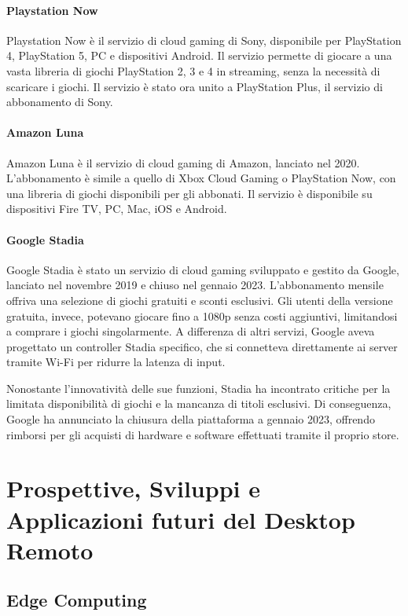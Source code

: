 \documentclass[12pt,a4paper,openright,twoside]{book}
\begin{document}
\subsubsection{Playstation Now}
Playstation Now è il servizio di cloud gaming di Sony, disponibile per PlayStation 4, PlayStation 5, PC e dispositivi Android. Il servizio permette di giocare a una vasta libreria di giochi PlayStation 2, 3 e 4 in streaming, senza la necessità di scaricare i giochi. Il servizio è stato ora unito a PlayStation Plus, il servizio di abbonamento di Sony.

\subsubsection{Amazon Luna}
Amazon Luna è il servizio di cloud gaming di Amazon, lanciato nel 2020. L'abbonamento è simile a quello di Xbox Cloud Gaming o PlayStation Now, con una libreria di giochi disponibili per gli abbonati. Il servizio è disponibile su dispositivi Fire TV, PC, Mac, iOS e Android.

\subsubsection{Google Stadia}
Google Stadia è stato un servizio di cloud gaming sviluppato e gestito da Google, lanciato nel novembre 2019 e chiuso nel gennaio 2023. L'abbonamento mensile offriva una selezione di giochi gratuiti e sconti esclusivi. Gli utenti della versione gratuita, invece, potevano giocare fino a 1080p senza costi aggiuntivi, limitandosi a comprare i giochi singolarmente.
A differenza di altri servizi, Google aveva progettato un controller Stadia specifico, che si connetteva direttamente ai server tramite Wi-Fi per ridurre la latenza di input.

Nonostante l'innovatività delle sue funzioni, Stadia ha incontrato critiche per la limitata disponibilità di giochi e la mancanza di titoli esclusivi. Di conseguenza, Google ha annunciato la chiusura della piattaforma a gennaio 2023, offrendo rimborsi per gli acquisti di hardware e software effettuati tramite il proprio store.

\chapter{Prospettive, Sviluppi e Applicazioni futuri del Desktop Remoto}

\section{Edge Computing}
\end{document}

